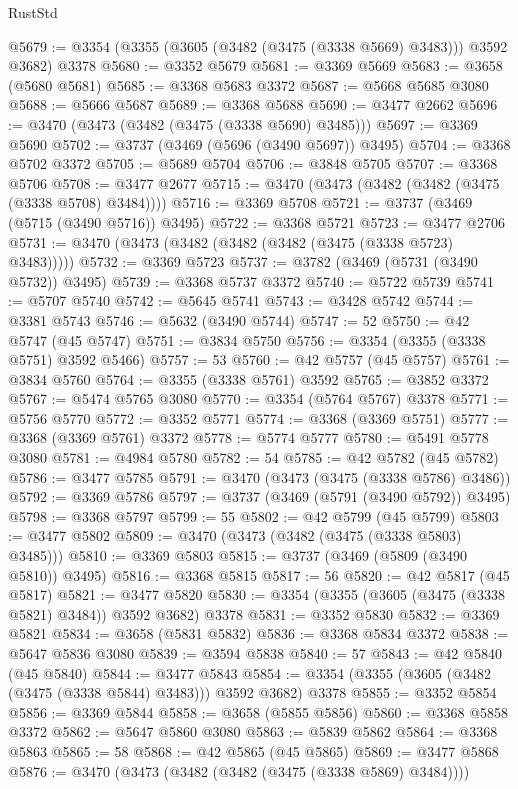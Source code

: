 \begin{lexlean}{RustStd}
\begin{coremodule}
@5679 := @3354 (@3355 (@3605 (@3482 (@3475 (@3338 @5669) @3483))) @3592 @3682) @3378
@5680 := @3352 @5679
@5681 := @3369 @5669
@5683 := @3658 (@5680 @5681)
@5685 := @3368 @5683 @3372
@5687 := @5668 @5685 @3080
@5688 := @5666 @5687
@5689 := @3368 @5688
@5690 := @3477 @2662
@5696 := @3470 (@3473 (@3482 (@3475 (@3338 @5690) @3485)))
@5697 := @3369 @5690
@5702 := @3737 (@3469 (@5696 (@3490 @5697)) @3495)
@5704 := @3368 @5702 @3372
@5705 := @5689 @5704
@5706 := @3848 @5705
@5707 := @3368 @5706
@5708 := @3477 @2677
@5715 := @3470 (@3473 (@3482 (@3482 (@3475 (@3338 @5708) @3484))))
@5716 := @3369 @5708
@5721 := @3737 (@3469 (@5715 (@3490 @5716)) @3495)
@5722 := @3368 @5721
@5723 := @3477 @2706
@5731 := @3470 (@3473 (@3482 (@3482 (@3482 (@3475 (@3338 @5723) @3483)))))
@5732 := @3369 @5723
@5737 := @3782 (@3469 (@5731 (@3490 @5732)) @3495)
@5739 := @3368 @5737 @3372
@5740 := @5722 @5739
@5741 := @5707 @5740
@5742 := @5645 @5741
@5743 := @3428 @5742
@5744 := @3381 @5743
@5746 := @5632 (@3490 @5744)
@5747 := 52
@5750 := @42 @5747 (@45 @5747)
@5751 := @3834 @5750
@5756 := @3354 (@3355 (@3338 @5751) @3592 @5466)
@5757 := 53
@5760 := @42 @5757 (@45 @5757)
@5761 := @3834 @5760
@5764 := @3355 (@3338 @5761) @3592
@5765 := @3852 @3372
@5767 := @5474 @5765 @3080
@5770 := @3354 (@5764 @5767) @3378
@5771 := @5756 @5770
@5772 := @3352 @5771
@5774 := @3368 (@3369 @5751)
@5777 := @3368 (@3369 @5761) @3372
@5778 := @5774 @5777
@5780 := @5491 @5778 @3080
@5781 := @4984 @5780
@5782 := 54
@5785 := @42 @5782 (@45 @5782)
@5786 := @3477 @5785
@5791 := @3470 (@3473 (@3475 (@3338 @5786) @3486))
@5792 := @3369 @5786
@5797 := @3737 (@3469 (@5791 (@3490 @5792)) @3495)
@5798 := @3368 @5797
@5799 := 55
@5802 := @42 @5799 (@45 @5799)
@5803 := @3477 @5802
@5809 := @3470 (@3473 (@3482 (@3475 (@3338 @5803) @3485)))
@5810 := @3369 @5803
@5815 := @3737 (@3469 (@5809 (@3490 @5810)) @3495)
@5816 := @3368 @5815
@5817 := 56
@5820 := @42 @5817 (@45 @5817)
@5821 := @3477 @5820
@5830 := @3354 (@3355 (@3605 (@3475 (@3338 @5821) @3484)) @3592 @3682) @3378
@5831 := @3352 @5830
@5832 := @3369 @5821
@5834 := @3658 (@5831 @5832)
@5836 := @3368 @5834 @3372
@5838 := @5647 @5836 @3080
@5839 := @3594 @5838
@5840 := 57
@5843 := @42 @5840 (@45 @5840)
@5844 := @3477 @5843
@5854 := @3354 (@3355 (@3605 (@3482 (@3475 (@3338 @5844) @3483))) @3592 @3682) @3378
@5855 := @3352 @5854
@5856 := @3369 @5844
@5858 := @3658 (@5855 @5856)
@5860 := @3368 @5858 @3372
@5862 := @5647 @5860 @3080
@5863 := @5839 @5862
@5864 := @3368 @5863
@5865 := 58
@5868 := @42 @5865 (@45 @5865)
@5869 := @3477 @5868
@5876 := @3470 (@3473 (@3482 (@3482 (@3475 (@3338 @5869) @3484))))

\end{coremodule}
\end{lexlean}
